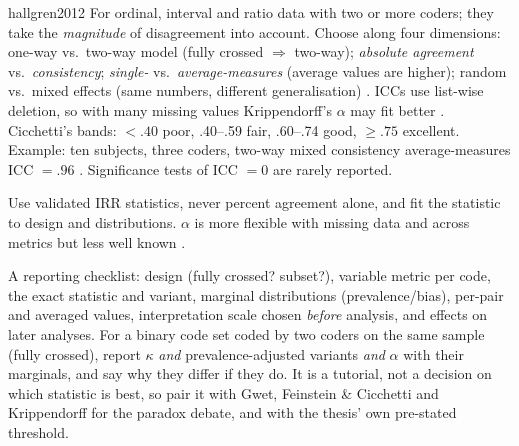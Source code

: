 \begin{papercard}{hallgren2012}
 For ordinal, interval and ratio data with two or more coders; they take the \emph{magnitude} of disagreement into account. Choose along four dimensions: one-way vs.\ two-way model (fully crossed $\Rightarrow$ two-way); \emph{absolute agreement} vs.\ \emph{consistency}; \emph{single-} vs.\ \emph{average-measures} (average values are higher); random vs.\ mixed effects (same numbers, different generalisation) . ICCs use list-wise deletion, so with many missing values Krippendorff's $\alpha$ may fit better . Cicchetti's bands: $<.40$ poor, .40--.59 fair, .60--.74 good, $\ge.75$ excellent. Example: ten subjects, three coders, two-way mixed consistency average-measures ICC $=.96$ . Significance tests of ICC $=0$ are rarely reported.

 Use validated IRR statistics, never percent agreement alone, and fit the statistic to design and distributions. $\alpha$ is more flexible with missing data and across metrics but less well known .

 A reporting checklist: design (fully crossed? subset?), variable metric per code, the exact statistic and variant, marginal distributions (prevalence/bias), per-pair and averaged values, interpretation scale chosen \emph{before} analysis, and effects on later analyses. For a binary code set coded by two coders on the same sample (fully crossed), report $\kappa$ \emph{and} prevalence-adjusted variants \emph{and} $\alpha$ with their marginals, and say why they differ if they do. It is a tutorial, not a decision on which statistic is best, so pair it with Gwet, Feinstein \& Cicchetti and Krippendorff for the paradox debate, and with the thesis' own pre-stated threshold.
\end{papercard}
